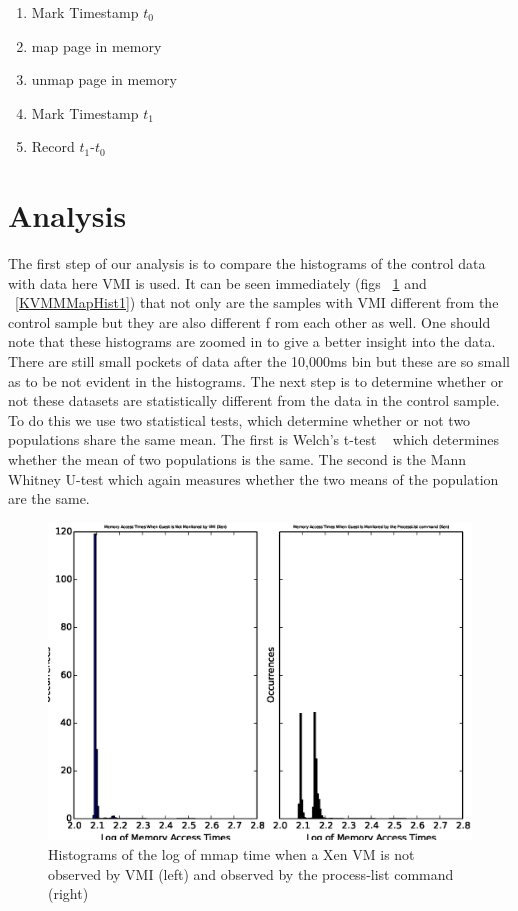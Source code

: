\begin{enumerate}\label{MMapAlg}
	\item Mark Timestamp $t_0$
	\item map page in memory
	\item unmap page in memory
	\item Mark Timestamp $t_1$
	\item Record $t_1$-$t_0$
\end{enumerate}

\section{Analysis}

The first step of our analysis is to compare the histograms of the control data with data here VMI is used.  It can be seen immediately (figs ~\ref{XenMMapHist1} and ~\ref{KVMMMapHist1}) that not only are the samples with VMI different from the control sample but they are also different f
rom each other as well. One should note that these histograms are zoomed in to give a better insight into the data. There are still small pockets of data after the 10,000ms bin but these are so small as to be not evident in the histograms.  The next step is to determine whether or not these datasets are statistically different from the data in the control sample. To do this we use two statistical tests, which determine whether or not two populations share the same mean. The first is Welch's t-test ~\cite{welch_generalization_1947} which determines whether the mean of two populations is the same. The second is the Mann Whitney U-test which again measures whether the two means of the population are the same.


	\begin{figure}[ht]\label{XenMMapHist1}
	  \centering
	  \includegraphics[width=\textwidth]{figures/XenNoVMIVsProcList.eps}
	  \caption{Histograms of the log of mmap time when a Xen VM is not observed by VMI (left) and observed by the process-list command (right)}
	\end{figure}


